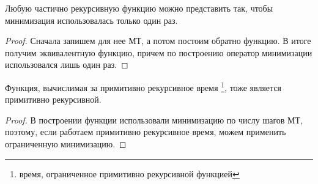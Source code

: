 \begin{cor}
    Любую частично рекурсивную функцию можно представить так, чтобы минимизация использовалась только один раз.
\end{cor}
\begin{proof}
    Сначала запишем для нее МТ, а потом постоим обратно функцию. В итоге получим эквивалентную функцию, причем по построению оператор минимизации использовался лишь один раз.
\end{proof}
\begin{cor}
	Функция, вычислимая за примитивно рекурсивное время \footnote{время, ограниченное примитивно рекурсивной функцией}, тоже является примитивно рекурсивной.
\end{cor}
\begin{proof}
    В построении функции использовали минимизацию по числу шагов МТ,  поэтому, если работаем примитивно рекурсивное время, можем применить ограниченную минимизацию. 
\end{proof}

